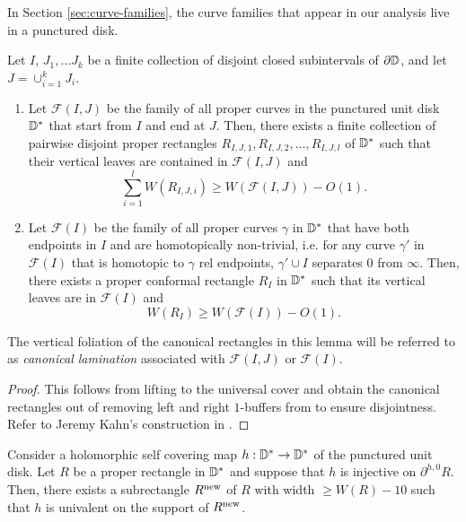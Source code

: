 \documentclass{amsart}
\begin{document}
In Section \ref{sec:curve-families}, the curve families that appear in our analysis live in a punctured disk.

\begin{lemma}
\label{lem:canonical-lamination}
    Let $I$, $J_1, \ldots J_k$ be a finite collection of disjoint closed subintervals of $\partial \mathbb{D}$, and let $J = \cup_{i=1}^k J_i$.
    \begin{enumerate}[label=\textnormal{(\arabic*)}]
        \item Let $\mathcal{F}(I,J)$ be the family of all proper curves in the punctured unit disk $\mathbb{D}^*$ that start from $I$ and end at $J$. 
        Then, there exists a finite collection of pairwise disjoint proper rectangles $R_{I,J,1}, R_{I,J,2},\ldots, R_{I,J,l}$ of $\mathbb{D}^*$ such that their vertical leaves are contained in $\mathcal{F}(I,J)$ and
    \[
        \sum_{i=1}^l W(R_{I,J,i}) \geq W(\mathcal{F}(I,J)) - O(1).
    \]
        \item Let $\mathcal{F}(I)$ be the family of all proper curves $\gamma$ in $\mathbb{D}^*$ that have both endpoints in $I$ and are homotopically non-trivial, i.e. for any curve $\gamma'$ in $\mathcal{F}(I)$ that is homotopic to $\gamma$ rel endpoints, $\gamma' \cup I$ separates $0$ from $\infty$. 
        Then, there exists a proper conformal rectangle $R_I$ in $\mathbb{D}^*$ such that its vertical leaves are in $\mathcal{F}(I)$ and
    \[
        W(R_I) \geq W(\mathcal{F}(I)) - O(1).
    \]
    \end{enumerate} 
\end{lemma}

The vertical foliation of the canonical rectangles in this lemma will be referred to as \emph{canonical lamination} associated with $\mathcal{F}(I,J)$ or $\mathcal{F}(I)$.

\begin{proof}
    This follows from lifting to the universal cover and obtain the canonical rectangles out of removing left and right $1$-buffers from to ensure disjointness. 
    Refer to Jeremy Kahn's construction in \cite{K06}.
\end{proof}

\begin{lemma}
\label{lem:univalent-pushforward}
    Consider a holomorphic self covering map $h :\mathbb{D}^* \to \mathbb{D}^*$ of the punctured unit disk. 
    Let $R$ be a proper rectangle in $\mathbb{D}^*$ and suppose that $h$ is injective on $\partial^{h,0} R$. 
    Then, there exists a subrectangle $R^{\textnormal{new}}$ of $R$ with width $\geq W(R) - 10$ such that $h$ is univalent on the support of $R^{\textnormal{new}}$.
\end{lemma}
\end{document}
